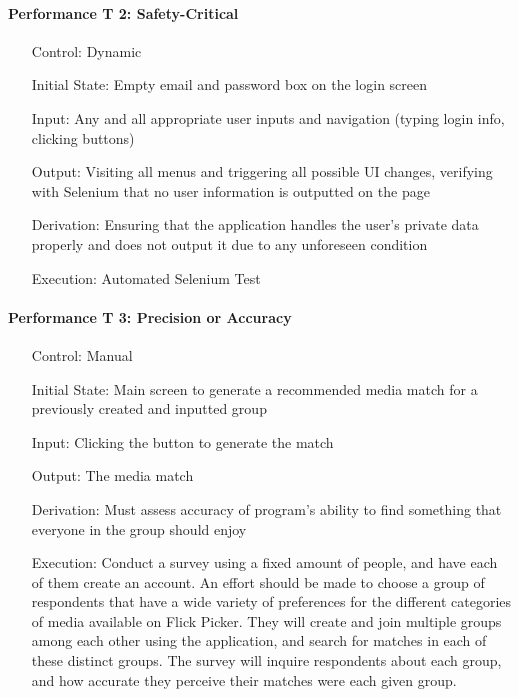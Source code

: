 \documentclass[12pt, titlepage]{article}
\begin{document}
\paragraph*{Performance T 2: Safety-Critical}
\begin{itemize}
	\item[Control:] Dynamic
	\item[Initial State:] Empty email and password box on the login screen
	\item[Input:] Any and all appropriate user inputs and navigation (typing login info, clicking buttons)
	\item[Output:] Visiting all menus and triggering all possible UI changes, verifying with Selenium that no user information is outputted on the page
	\item[Derivation:] Ensuring that the application handles the user's private data properly and does not output it due to any unforeseen condition
	\item[Execution:] Automated Selenium Test
\end{itemize}

\paragraph*{Performance T 3: Precision or Accuracy}
\begin{itemize}
	\item[Control:] Manual
	\item[Initial State:] Main screen to generate a recommended media match for a previously created and inputted group
	\item[Input:] Clicking the button to generate the match
	\item[Output:] The media match
	\item[Derivation:] Must assess accuracy of program's ability to find something that everyone in the group should enjoy
	\item[Execution:] Conduct a survey using a fixed amount of people, and have each of them create an account. An effort should be made to choose a group of respondents that have a wide variety of preferences for the different categories of media available on Flick Picker. They will create and join multiple groups among each other using the application, and search for matches in each of these distinct groups. The survey will inquire respondents about each group, and how accurate they perceive their matches were each given group.
\end{itemize}
\end{document}
